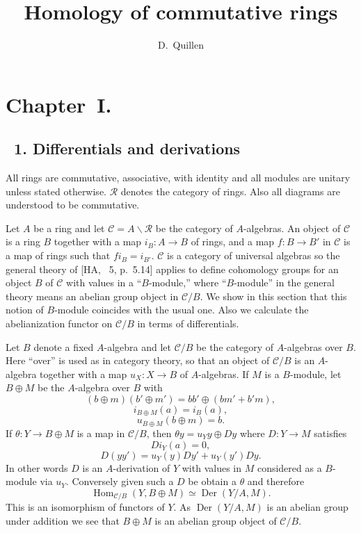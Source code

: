 \documentclass[10pt,reqno]{amsart}
\title{Homology of commutative rings}
\author{D.~Quillen}
\DeclareMathOperator{\Hom}{Hom}
\DeclareMathOperator{\Der}{Der}
\newcommand{\cat}{\mathcal}
\newcommand{\C}{\cat{C}}
\newcommand{\R}{\cat{R}}
\begin{document}
\maketitle

\section*{Chapter~I.}
\subsection*{\textsection~1. Differentials and derivations}

All rings are commutative, associative, with identity and all modules are unitary unless
stated otherwise. $\R$ denotes the category of rings. Also all diagrams are understood
to be commutative.

Let $A$ be a ring and let $\C=A\backslash\R$ be the category of $A$-algebras.
An object of $\C$ is a ring $B$ together with a map $i_B:A\to B$ of rings,
and a map $f:B\to B'$ in $\C$ is a map of rings such that $fi_B=i_{B'}$. $\C$
is a category of universal algebras so the general theory of [HA, \textsection~5, p.~5.14]
applies to define cohomology groups for an object $B$
of $\C$ with values in a ``$B$-module,'' where ``$B$-module'' in the general theory
means an abelian group object in $\C/B$. We show in this section that this notion of
$B$-module coincides with the usual one. Also we calculate the abelianization functor
on $\C/B$ in terms of differentials.

Let $B$ denote a fixed $A$-algebra and let $\C/B$ be the category of $A$-algebras
over $B$. Here ``over'' is used as in category theory, so that an object of $\C/B$
is an $A$-algebra together with a map $u_X:X\to B$ of $A$-algebras. If $M$ is a
$B$-module, let $B\oplus M$ be the $A$-algebra over $B$ with
\[
  (b\oplus m)(b'\oplus m')=bb'\oplus(bm'+b'm),
\]
\[
  i_{B\oplus M}(a)=i_B(a),
\]
\[
  u_{B\oplus M}(b\oplus m)=b.
\]
If $\theta:Y\to B\oplus M$ is a map in $\C/B$, then $\theta y=u_Y y\oplus Dy$ where
$D:Y\to M$ satisfies
\[
  Di_Y(a)=0,
\]
\[
  D(yy')=u_Y(y)Dy'+u_Y(y')Dy.
\]
In other words $D$ is an $A$-derivation of $Y$ with values in $M$ considered as a
$B$-module via $u_Y$. Conversely given such a $D$ be obtain a $\theta$ and therefore
\[
  \Hom_{\C/B}(Y,B\oplus M)\simeq\Der(Y/A,M).\tag{1.1}
\]
This is an isomorphism of functors of $Y$. As $\Der(Y/A,M)$ is an abelian group under
addition we see that $B\oplus M$ is an abelian group object of $\C/B$.
\end{document}
